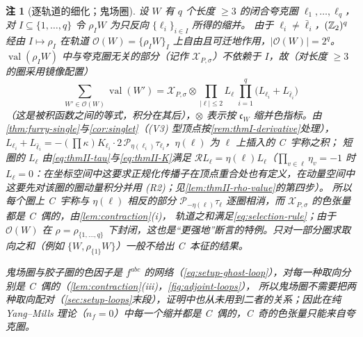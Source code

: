\documentclass[UTF8,a4paper,11pt,fontset=fandol]{ctexart}
\let\amsmathbb\mathbb
\renewcommand{\mathbb}[1]{\ifx1#1\mathds{1}\else\amsmathbb{#1}\fi}
\theoremstyle{cplain}
\theoremstyle{cdefinition}
\theoremstyle{cremark}
\newtheorem{remark}[theorem]{注}
\numberwithin{equation}{section}
\newcommand{\Rop}{\mathcal{R}}                       %
\begin{document}
\begin{remark}[逐轨道的细化；鬼场圈]\label{rem:thmII-orbits}
设 $W$ 有 $q$ 个长度 $\ge3$ 的闭合夸克圈 $\ell_1,\dots,\ell_q$，对 $I\subseteq\{1,\dots,q\}$ 令 $\rho_IW$ 为只反向 $\{\ell_i\}_{i\in I}$ 所得的缩并。
由于 $\ell_i\neq\bar\ell_i$，$(\mathbb Z_2)^q$ 经由 $I\mapsto\rho_I$ 在轨道 $\mathcal O(W)=\{\rho_IW\}_I$ 上自由且可迁地作用，$|\mathcal O(W)|=2^q$。
$\operatorname{val}(\rho_IW)$ 中与夸克圈无关的部分（记作 $\mathcal X_{P,\sigma}$）不依赖于 $I$，故（对长度 $\ge3$ 的圈采用镜像配置）
\[
\sum_{W'\in\mathcal O(W)}\operatorname{val}(W')=\mathcal X_{P,\sigma}\otimes\prod_{|\ell|\le2}L_\ell\ \prod_{i=1}^{q}\bigl(L_{\ell_i}+L_{\bar\ell_i}\bigr)
\]
（这是被积函数之间的等式，积分在其后），$\otimes$ 表示按 $\mathfrak c_W$ 缩并色指标。由\cref{thm:furry-single}与\cref{cor:singlet}（(V3) 型顶点按\cref{rem:thmI-derivative}处理），$L_{\ell_i}+L_{\bar\ell_i}=-(\prod\kappa)K_{\ell_i}\cdot2\,\mathcal P_{\eta(\ell_i)}\tau_{\ell_i}$，$\eta(\ell)$ 为 $\ell$ 上插入的 C~宇称之积；
短圈的 $L_\ell$ 由\cref{eq:thmII-tau}与\cref{eq:thmII-K}满足 $\Rop L_\ell=\eta(\ell)L_\ell$（$\prod_{v\in\ell}\eta_v=-1$ 时 $L_\ell=0$：在坐标空间中这要求正规化传播子在顶点重合处也有定义，在动量空间中这要先对该圈的圈动量积分并用 (R2)；见\cref{lem:thmII-rho-value}的第四步）。
所以每个圈上 C~宇称与 $\eta(\ell)$ 相反的部分 $\mathcal P_{-\eta(\ell)}\tau_\ell$ \emph{逐圈}相消，而 $\mathcal X_{P,\sigma}$ 的色张量都是 C~偶的，由\cref{lem:contraction}(i)，
轨道之和满足\cref{eq:selection-rule}；由于 $\mathcal O(W)$ 在 $\rho=\rho_{\{1,\dots,q\}}$ 下封闭，这也是“更强地”断言的特例。只对一部分圈求取向之和（例如 $\{W,\rho_{\{1\}}W\}$）一般\emph{不}给出 C~本征的结果。

鬼场圈与胶子圈的色因子是 $f^{abc}$ 的网络（\cref{eq:setup-ghost-loop}），对每一种取向分别是 C~偶的（\cref{lem:contraction}(iii)，\cref{fig:adjoint-loops}），
所以鬼场圈不需要把两种取向配对（\cref{sec:setup-loops}末段），证明中也从未用到二者的关系；因此在纯 Yang--Mills 理论（$n_f=0$）中\emph{每一个}缩并都是 C~偶的，C~奇的色张量只能来自夸克圈。
\end{remark}
\end{document}

